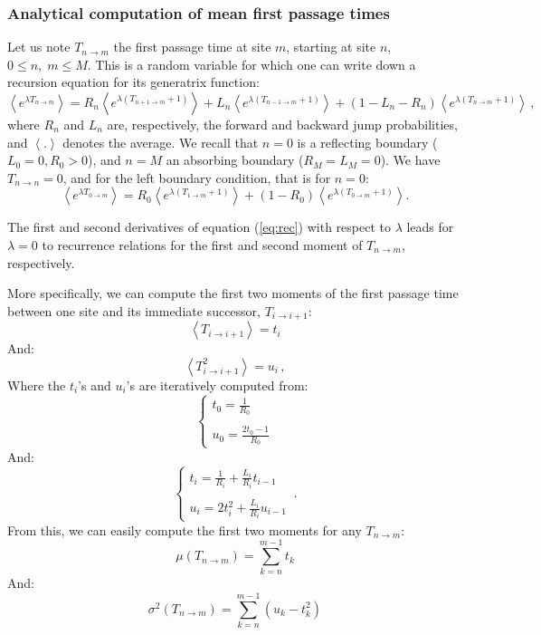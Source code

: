 \documentclass[12pt,twocolumn,amsmath,amssymb,aps,longbibliography]{revtex4-1}  %
\newcommand{\beq}{\begin{equation}}
\newcommand{\eneq}{\end{equation}}
\begin{document}
\subsubsection{Analytical computation of mean first passage times}

Let us note $T_{n\rightarrow m}$ the first passage time at site $m$, starting at site $n$, $0 \leq n ,\; m \leq M$. This is a random variable for which one can write down a recursion equation for its generatrix function:
\beq
\left < e^{\lambda T_{n\rightarrow m}}\right > = R_n \left < e^{\lambda (T_{n+ 1\rightarrow m}+1)}\right> + L_n \left < e^{\lambda (T_{n-1\rightarrow m}+1)}\right> + (1 - L_n - R_n) \left < e^{\lambda( T_{n\rightarrow m}+1)}\right> \, ,
\label{eq:rec}
\eneq
where $R_n$ and $L_n$ are, respectively, the forward and backward jump probabilities, and $\left < .\right>$ denotes the average. We recall that $n=0$ is a reflecting boundary ($L_0=0, R_0 >0$), and $n=M$ an absorbing boundary ($R_M=L_M=0$). We have $T_{n\rightarrow n}=0$, and for the left boundary condition, that is for $n=0$:
\beq 
\left < e^{\lambda T_{0\rightarrow m}}\right > = R_0 \left < e^{\lambda (T_{1\rightarrow m}+1)}\right> + (1 - R_0) \left < e^{\lambda (T_{0\rightarrow m}+1)}\right>. 
\eneq

The first and second derivatives of equation (\ref{eq:rec}) with respect to $\lambda$ leads for $\lambda=0$ to recurrence relations for the first and second moment of  $T_{n\rightarrow m}$, respectively.

More specifically, we can compute the first two moments of the first passage time between one site and its immediate successor, $T_{i \rightarrow i +1}$:
\beq
\left < T_{i \rightarrow i +1 } \right > = t_i
\eneq
And:
\beq
  \left < T_{i \rightarrow i +1} ^ 2 \right > = u_i \, ,
\eneq
Where the $t_i$'s and $u_i$'s are iteratively computed from:
\beq
\begin{cases}\displaystyle t_0 = \frac{1}{R_0} \\ \\ \displaystyle u_0 = \frac{2 t_0 - 1}{R_0} \end{cases}
\eneq
And:
\beq
\begin{cases} \displaystyle t_{i} = \frac{1}{R_i}  + \frac{L_i}{R_i} t_{i-1}  \\ \\ \displaystyle u_i = 2 t_i^2 + \frac{L_i}{R_i} u_{i-1} \end{cases} \, . 
\eneq
From this, we can easily compute the first two moments for any $T_{n \rightarrow m}$:
\beq
\mu \left(T_{n \rightarrow m} \right) = \sum \limits _{k=n} ^ {m-1} t_k
\eneq
And:
\beq
\sigma ^ 2 \left(T_{n \rightarrow m} \right) = \sum \limits _{k=n} ^ {m-1} \left( u_k - t_k ^ 2 \right)
\eneq
\end{document}
